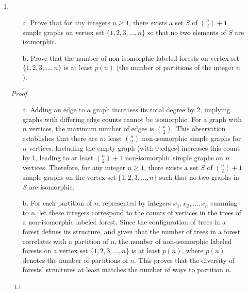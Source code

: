 \documentclass[11pt]{article}
\begin{document}
\begin{enumerate}
        \begin{proof}
            \begin{enumerate}
                \item[a.] $10$
                \item[b.] $8$
                \item[c.] $n!$
            \end{enumerate}
        \end{proof}

    \item
        \begin{itemize}
            \item[a.] Prove that for any integers $n\geq 1$, there exists a set $S$ of ${n \choose 2}+1$ simple graphs on vertex set $\{1, 2, 3, \dots, n\}$ so that no two elements of $S$ are isomorphic.
            \item[b.] Prove that the number of non-isomorphic labeled forests on vertex set $\{1, 2, 3, \dots, n\}$ is at least $p(n)$ (the number of partitions of the integer $n$).
        \end{itemize}

        \begin{proof}
            \begin{itemize}
                \item[a.] Adding an edge to a graph increases its total degree by 2, implying graphs with differing edge counts cannot be isomorphic. For a graph with \(n\) vertices, the maximum number of edges is \({n \choose 2}\). This observation establishes that there are at least \({n \choose 2}\) non-isomorphic simple graphs for \(n\) vertices. Including the empty graph (with 0 edges) increases this count by 1, leading to at least \({n \choose 2} + 1\) non-isomorphic simple graphs on \(n\) vertices. Therefore, for any integer \(n \geq 1\), there exists a set \(S\) of \({n \choose 2} + 1\) simple graphs on the vertex set \(\{1, 2, 3, \ldots, n\}\) such that no two graphs in \(S\) are isomorphic.
                \item[b.] For each partition of \(n\), represented by integers \(x_1, x_2, \ldots, x_n\) summing to \(n\), let these integers correspond to the counts of vertices in the trees of a non-isomorphic labeled forest. Since the configuration of trees in a forest defines its structure, and given that the number of trees in a forest correlates with a partition of \(n\), the number of non-isomorphic labeled forests on a vertex set \(\{1, 2, 3, \ldots, n\}\) is at least \(p(n)\), where \(p(n)\) denotes the number of partitions of \(n\). This proves that the diversity of forests' structures at least matches the number of ways to partition \(n\).
            \end{itemize}
        \end{proof}


\end{enumerate}
\end{document}
